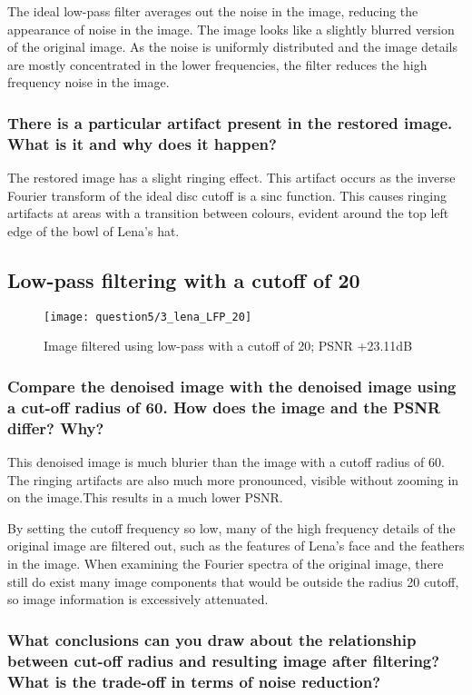 The ideal low-pass filter averages out the noise in the image, reducing the appearance of noise in the image. The image looks like a slightly blurred version of the original image. As the noise is uniformly distributed and the image details are mostly concentrated in the lower frequencies, the filter reduces the high frequency noise in the image.

\subsubsection{There is a particular artifact present in the restored image. What is it and why does it happen?}

The restored image has a slight ringing effect. This artifact occurs as the inverse Fourier transform of the ideal disc cutoff is a sinc function. This causes ringing artifacts at areas with a transition between colours, evident around the top left edge of the bowl of Lena's hat.

\subsection{Low-pass filtering with a cutoff of 20}
\begin{figure}[ht]
\centering
	\texttt{[image: question5/3\_lena\_LFP\_20]}
	\caption{Image filtered using low-pass with a cutoff of 20; PSNR +23.11dB}
\end{figure}

\subsubsection{Compare the denoised image with the denoised image using a cut-off radius of 60. How does the
image and the PSNR differ? Why?}

This denoised image is much blurier than the image with a cutoff radius of 60. The ringing artifacts are also much more pronounced, visible without zooming in on the image.This results in a much lower PSNR. 

By setting the cutoff frequency so low, many of the high frequency details of the original image are filtered out, such as the features of Lena's face and the feathers in the image. When examining the Fourier spectra of the original image, there still do exist many image components that would be outside the radius 20 cutoff, so image information is excessively attenuated.

\subsubsection{What conclusions can you draw about the relationship between cut-off radius and resulting image after filtering? What is the trade-off in terms of noise reduction?}

